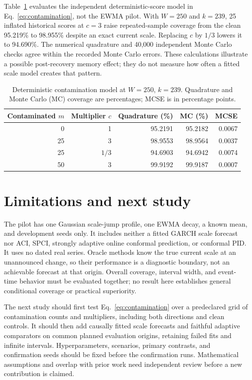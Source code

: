 \documentclass[11pt]{article}
\begin{document}
Table~\ref{tab:contamination} evaluates the independent deterministic-score
model in Eq.~\eqref{eq:contamination}, not the EWMA pilot. With $W=250$ and
$k=239$, 25 inflated historical scores at $c=3$ raise repeated-sample
coverage from the clean 95.219\% to 98.955\% despite an exact current scale.
Replacing $c$ by $1/3$ lowers it to 94.690\%. The numerical quadrature and
40,000 independent Monte Carlo checks agree within the recorded Monte Carlo
errors. These calculations illustrate a possible post-recovery memory effect;
they do not measure how often a fitted scale model creates that pattern.

\begin{table}[H]
\centering
\small
\caption{Deterministic contamination model at $W=250$, $k=239$. Quadrature
and Monte Carlo (MC) coverage are percentages; MCSE is in percentage points.}
\label{tab:contamination}
\begin{tabular}{rrrrr}
\toprule
Contaminated $m$ & Multiplier $c$ & Quadrature (\%) & MC (\%) & MCSE \\
\midrule
0 & 1 & 95.2191 & 95.2182 & 0.0067 \\
25 & 3 & 98.9553 & 98.9564 & 0.0037 \\
25 & $1/3$ & 94.6903 & 94.6942 & 0.0074 \\
50 & 3 & 99.9192 & 99.9187 & 0.0007 \\
\bottomrule
\end{tabular}
\end{table}

\section{Limitations and next study}
The pilot has one Gaussian scale-jump profile, one EWMA decay, a known mean,
and development seeds only. It includes neither a fitted GARCH scale forecast
nor ACI, SPCI, strongly adaptive online conformal prediction, or conformal
PID. It uses no dated real series. Oracle methods know the true current scale
at an unannounced change, so their performance is a diagnostic boundary, not
an achievable forecast at that origin. Overall coverage, interval width, and
event-time behavior must be evaluated together; no result here establishes
general conditional coverage or practical superiority.

The next study should first test Eq.~\eqref{eq:contamination} over a
predeclared grid of contamination counts and multipliers, including both
directions and clean controls. It should then add causally fitted scale
forecasts and faithful adaptive comparators on common planned evaluation
origins, retaining failed fits and infinite intervals. Hyperparameters,
scenarios, primary contrasts, and confirmation seeds should be fixed before
the confirmation runs. Mathematical assumptions and overlap with prior work
need independent review before a new contribution is claimed.
\end{document}
